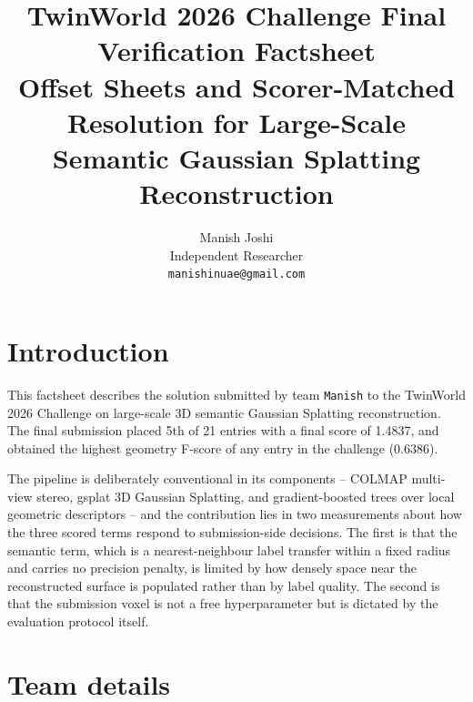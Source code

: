 \documentclass[10pt,twocolumn,letterpaper]{article}
\begin{document}
\title{TwinWorld 2026 Challenge Final Verification Factsheet\\
Offset Sheets and Scorer-Matched Resolution for Large-Scale\\
Semantic Gaussian Splatting Reconstruction}

\author{Manish Joshi\\
Independent Researcher\\
{\tt\small manishinuae@gmail.com}
}
\maketitle

\section{Introduction}

This factsheet describes the solution submitted by team
\texttt{Manish} to the TwinWorld 2026 Challenge on large-scale 3D semantic
Gaussian Splatting reconstruction. The final submission placed 5th of 21 entries
with a final score of 1.4837, and obtained the highest geometry F-score of any
entry in the challenge (0.6386).

The pipeline is deliberately conventional in its components -- COLMAP
multi-view stereo, gsplat 3D Gaussian Splatting, and gradient-boosted trees over
local geometric descriptors -- and the contribution lies in two measurements
about how the three scored terms respond to submission-side decisions. The first
is that the semantic term, which is a nearest-neighbour label transfer within a
fixed radius and carries no precision penalty, is limited by how densely space
near the reconstructed surface is populated rather than by label quality. The
second is that the submission voxel is not a free hyperparameter but is dictated
by the evaluation protocol itself.

\section{Team details}
\end{document}
